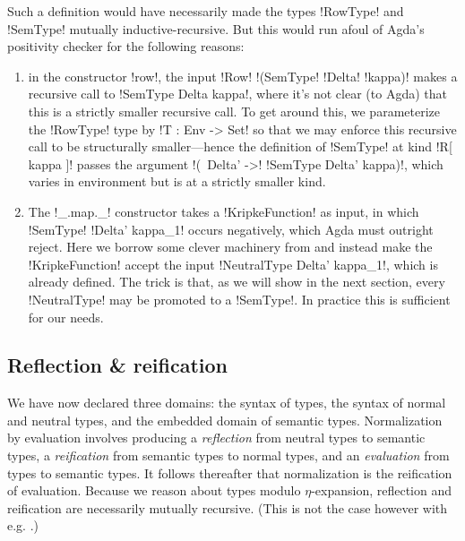 \documentclass[sigplan,10pt,review]{acmart}\settopmatter{printfolios=true,printccs=false,printacmref=false}
\begin{document}
\Ni Such a definition would have necessarily made the types !RowType! and !SemType! mutually inductive-recursive. But this would run afoul of Agda's positivity checker for the following reasons:
\begin{enumerate}
  \item in the constructor !row!, the input !Row! !(SemType! !Delta! !kappa)! makes a recursive call to !SemType Delta kappa!, where it's not clear (to Agda) that this is a strictly smaller recursive call. To get around this, we parameterize the !RowType! type by !T : Env -> Set! so that we may enforce this recursive call to be structurally smaller---hence the definition of !SemType! at kind !R[ kappa ]! passes the argument !(\ Delta' ->! !SemType Delta' kappa)!, which varies in environment but is at a strictly smaller kind.
  \item  The !_.map._! constructor takes a !KripkeFunction! as input, in which !SemType! !Delta' kappa_1! occurs negatively, which Agda must outright reject. Here we borrow some clever machinery from \citet{AllaisBM13} and instead make the !KripkeFunction! accept the input !NeutralType Delta' kappa_1!, which is already defined. The trick is that, as we will show in the next section, every !NeutralType! may be promoted to a !SemType!. In practice this is sufficient for our needs.
\end{enumerate}

\subsection{Reflection \& reification}

We have now declared three domains: the syntax of types, the syntax of normal and neutral types, and the embedded domain of semantic types. Normalization by evaluation involves producing a \emph{reflection} from neutral types to semantic types, a \emph{reification} from semantic types to normal types, and an \emph{evaluation} from types to semantic types. It follows thereafter that normalization is the reification of evaluation. Because we reason about types modulo $\eta$-expansion, reflection and reification are necessarily mutually recursive. (This is not the case however with e.g. \citet{ChapmanKNW19}.)
\end{document}
